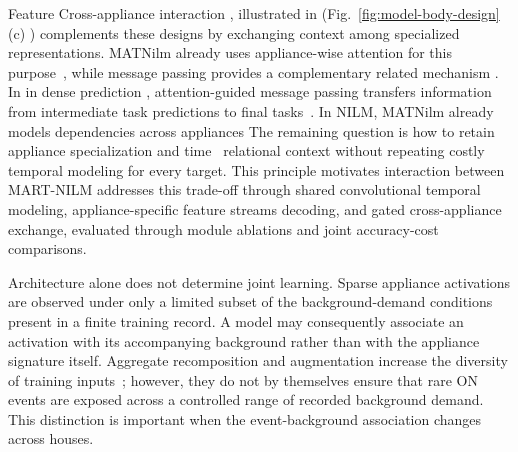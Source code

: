 \documentclass[journal]{IEEEtran}
\providecommand{\DIFadd}[1]{{\protect\color{blue} \sf #1}} %
\providecommand{\DIFdel}[1]{{\protect\color{red} \scriptsize #1}} %
\providecommand{\DIFaddbegin}{} %
\providecommand{\DIFaddend}{} %
\providecommand{\DIFdelbegin}{} %
\providecommand{\DIFdelend}{} %
\providecommand{\DIFscaledelfig}{0.5}
\newlength{\DIFdelgraphicswidth} %
\newlength{\DIFdelgraphicsheight} %
\providecommand{\DIFaddincludegraphics}[2][]{{\color{blue}\fbox{\DIFOincludegraphics[#1]{#2}}}} %
\providecommand{\DIFdelincludegraphics}[2][]{%
\sbox{\DIFdelgraphicsbox}{\DIFOincludegraphics[#1]{#2}}%
\settoboxwidth{\DIFdelgraphicswidth}{\DIFdelgraphicsbox} %
\settoboxtotalheight{\DIFdelgraphicsheight}{\DIFdelgraphicsbox} %
\scalebox{\DIFscaledelfig}{%
\parbox[b]{\DIFdelgraphicswidth}{\usebox{\DIFdelgraphicsbox}\\[-\baselineskip] \rule{\DIFdelgraphicswidth}{0em}}\llap{\resizebox{\DIFdelgraphicswidth}{\DIFdelgraphicsheight}{%
\setlength{\unitlength}{\DIFdelgraphicswidth}%
\begin{picture}(1,1)%
\thicklines\linethickness{2pt} %
{\color[rgb]{1,0,0}\put(0,0){\framebox(1,1){}}}%
{\color[rgb]{1,0,0}\put(0,0){\line( 1,1){1}}}%
{\color[rgb]{1,0,0}\put(0,1){\line(1,-1){1}}}%
\end{picture}%
}\hspace*{3pt}}} %
} %
\DeclareRobustCommand{\DIFaddbegin}{\DIFOaddbegin \let\includegraphics\DIFaddincludegraphics} %
\DeclareRobustCommand{\DIFaddend}{\DIFOaddend \let\includegraphics\DIFOincludegraphics} %
\DeclareRobustCommand{\DIFdelbegin}{\DIFOdelbegin \let\includegraphics\DIFdelincludegraphics} %
\DeclareRobustCommand{\DIFdelend}{\DIFOaddend \let\includegraphics\DIFOincludegraphics} %
\begin{document}
\DIFdelbegin \DIFdel{Feature }\DIFdelend \DIFaddbegin \DIFadd{Cross-appliance }\DIFaddend interaction \DIFdelbegin \DIFdel{, illustrated in }\DIFdelend \DIFaddbegin \DIFadd{(}\DIFaddend Fig.~\ref{fig:model-body-design}(c)\DIFaddbegin \DIFadd{) complements these designs by exchanging context among specialized representations. MATNilm already uses appliance-wise attention for this purpose~\cite{xiong2024matnilm}}\DIFaddend , \DIFaddbegin \DIFadd{while message passing }\DIFaddend provides a \DIFdelbegin \DIFdel{complementary }\DIFdelend \DIFaddbegin \DIFadd{related }\DIFaddend mechanism \DIFdelbegin \DIFdel{. In }\DIFdelend \DIFaddbegin \DIFadd{in }\DIFaddend dense prediction\DIFdelbegin \DIFdel{, attention-guided message passing transfers information from intermediate task predictions to final tasks}\DIFdelend ~\cite{xu2018padnet}. \DIFdelbegin \DIFdel{In NILM, MATNilm already models dependencies across appliances }\DIFdelend \DIFaddbegin \DIFadd{The remaining question is how to retain appliance specialization }\DIFaddend and \DIFdelbegin \DIFdel{time~\cite{xiong2024matnilm}}\DIFdelend \DIFaddbegin \DIFadd{relational context without repeating costly temporal modeling for every target}\DIFaddend . \DIFdelbegin \DIFdel{This principle motivates interaction between }\DIFdelend \DIFaddbegin \DIFadd{MART-NILM addresses this trade-off through shared convolutional temporal modeling, }\DIFaddend appliance-specific \DIFdelbegin \DIFdel{feature streams}\DIFdelend \DIFaddbegin \DIFadd{decoding, and gated cross-appliance exchange, evaluated through module ablations and joint accuracy-cost comparisons}\DIFaddend .

Architecture alone does not determine joint learning. \DIFaddbegin \DIFadd{Sparse appliance activations are observed under only a limited subset of the background-demand conditions present in a finite training record. A model may consequently associate an activation with its accompanying background rather than with the appliance signature itself. Aggregate recomposition and augmentation increase the diversity of training inputs~\cite{kelly2015neural,liu2026recomposition,chen2021sca}; however, they do not by themselves ensure that rare ON events are exposed across a controlled range of recorded background demand. This distinction is important when the event-background association changes across houses.
}
\end{document}
